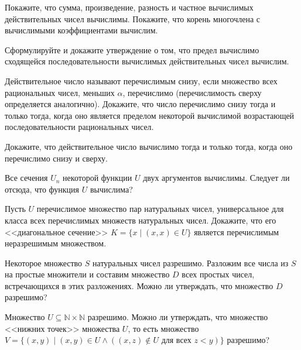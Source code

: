 \begin{task}
	Покажите, что сумма, произведение, разность и частное вычислимых действительных чисел вычислимы. Покажите, что корень
    многочлена с вычислимыми коэффициентами вычислим. 
\end{task}

\begin{task}
    Сформулируйте и докажите утверждение о том, что предел вычислимо сходящейся последовательности вычислимых действительных чисел
    вычислим.
\end{task}

\begin{task}
    Действительное число называют перечислимым снизу, если множество всех рациональных чисел, меньших $\alpha$, перечислимо
    (перечислимость сверху определяется аналогично). Докажите, что число перечислимо снизу тогда и только тогда, когда оно
    является пределом некоторой вычислимой возрастающей последовательности рациональных чисел.
\end{task}

\begin{task}
    Докажите, что действительное число вычислимо тогда и только тогда, когда оно перечислимо снизу и сверху.
\end{task}

\begin{task}
    Все сечения $U_n$ некоторой функции $U$ двух аргументов вычислимы. Следует ли отсюда, что функция $U$ вычислима?
\end{task}

\begin{task}
    Пусть $U$ перечислимое множество пар натуральных чисел, универсальное для класса всех перечислимых множеств натуральных
    чисел. Докажите, что его <<диагональное сечение>> $K = \{x \mid (x, x) \in U\}$ является перечислимым неразрешимым
    множеством.
\end{task}

\begin{task}
    Некоторое множество $S$ натуральных чисел разрешимо. Разложим все числа из $S$ на простые множители и составим множество $D$
    всех простых чисел, встречающихся в этих разложениях. Можно ли утверждать, что множество $D$ разрешимо?
\end{task}

\begin{task}
    Множество $U \subseteq \mathbb{N} \times \mathbb{N}$ разрешимо. Можно ли утверждать, что множество <<нижних точек>> множества
    $U$, то есть множество $V = \{(x, y) \mid (x, y) \in U \land ((x, z) \notin U \mbox{ для всех } z < y)\}$ разрешимо?
\end{task}

